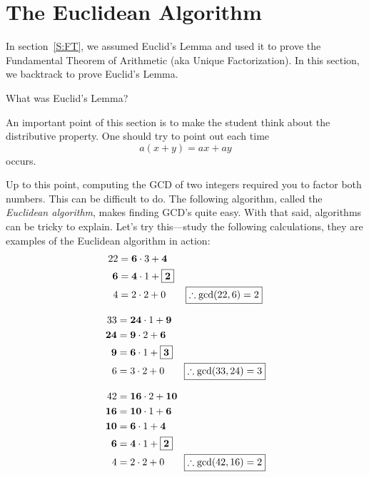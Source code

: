 \section{The Euclidean Algorithm}\label{S:EA}
In section~\ref{S:FT}, we assumed Euclid's Lemma and used it to prove the Fundamental 
Theorem of Arithmetic (aka Unique Factorization).  In this section, we backtrack 
to prove Euclid's Lemma.  

\begin{question}
What was Euclid's Lemma?
\end{question}
\QM

\begin{teachingnote}
An important point of this section is to make the student think about
the distributive property. One should try to point out each time
\[
a(x+y) = ax + ay
\]
occurs.
\end{teachingnote}

Up to this point, computing the GCD of two integers required you to
factor both numbers.  This can be difficult to do. The following
algorithm, called the \textit{Euclidean algorithm}, makes finding
GCD's quite easy. With that said, algorithms can be tricky to
explain. Let's try this---study the following calculations, they are
examples of the Euclidean algorithm in action:
\begin{align*}
22 &= \boldsymbol{6}\cdot 3 + \boldsymbol{4}\\ 
\boldsymbol{6} &= \boldsymbol{4}
\cdot 1 + \fbox{$\boldsymbol{2}$}\\ 4 &= 2 \cdot 2 + 0 \qquad 
\fbox{$\therefore \gcd(22,6) = 2$}
\end{align*}

\begin{align*}
33 &= \boldsymbol{24}\cdot 1 + \boldsymbol{9}\\
\boldsymbol{24} &= \boldsymbol{9} \cdot 2 + \boldsymbol{6}\\
\boldsymbol{9} &= \boldsymbol{6} \cdot 1 + \fbox{$\boldsymbol{3}$}\\
6 &= 3 \cdot 2 + 0 \qquad \fbox{$\therefore \gcd(33,24) = 3$} 
\end{align*}

\begin{align*}
42 &= \boldsymbol{16}\cdot 2 + \boldsymbol{10}\\
\boldsymbol{16} &= \boldsymbol{10} \cdot 1 + \boldsymbol{6}\\
\boldsymbol{10} &= \boldsymbol{6} \cdot 1 + \boldsymbol{4}\\
\boldsymbol{6} &= \boldsymbol{4} \cdot 1 + \fbox{$\boldsymbol{2}$}\\
4 &= 2 \cdot 2 + 0 \qquad \fbox{$\therefore \gcd(42,16) = 2$} 
\end{align*}

